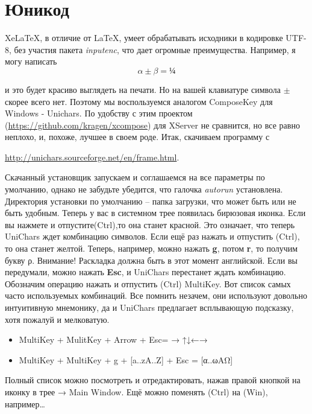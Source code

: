 \section{Юникод}
Xe\LaTeX, в отличие от \LaTeX, умеет обрабатывать исходники в кодировке UTF-8, без участия пакета {\it inputenc}, что дает огромные преимущества.
Например, я могу написать
$$
α±β = ¼
 $$

и это будет красиво выглядеть на печати. Но на вашей клавиатуре
символа $±$ скорее всего нет.  Поэтому мы воспользуемся аналогом
ComposeKey для Windows - Unichars.  По удобству с этим проектом
(\url{https://github.com/kragen/xcompose}) для XServer не сравнится,
но все равно неплохо, и, похоже, лучшее в своем роде.  Итак, скачиваем
программу с \par\url{http://unichars.sourceforge.net/en/frame.html}.

Скачанный установщик запускаем и соглашаемся на все параметры по
умолчанию, однако не забудьте убедится, что галочка {\it autorun}
установлена.  Директория установки по умолчанию -- папка загрузки, что
может быть или не быть удобным.  Теперь у вас в системном трее
появилась бирюзовая иконка. Если вы нажмете и отпустите(Ctrl),то она
станет красной. Это означает, что теперь UniChars ждет комбинацию
символов. Если ещё раз нажать и отпустить (Ctrl), то она станет
желтой.  Теперь, например, можно нажать {\bf g}, потом {\bf r}, то
получим букву ρ. Внимание! Раскладка должна быть в этот момент
английской.  Если вы передумали, можно нажать {\bf Esc}, и UniChars
перестанет ждать комбинацию. Обозначим операцию нажать и отпустить
(Ctrl) MultiKey. Вот список самых часто используемых комбинаций. Все
помнить незачем, они используют довольно интуитивную мнемонику, да и
UniChars предлагает всплывающую подсказку, хотя пожалуй и мелковатую.
\begin{itemize}
  \item MultiKey + MulitKey + Arrow + Esc= → ↑↓←→
  \item MultiKey + MultiKey + g + [a..zA..Z] + Esc = [α..ωΑΩ]   
\end{itemize}
Полный список можно посмотреть и отредактировать, нажав правой кнопкой на иконку в трее → Main Window. Ещё можно поменять (Ctrl) на (Win), 
например…
